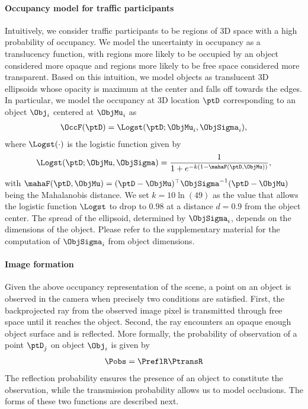 \paragraph{Occupancy model for traffic participants}
Intuitively, we consider traffic participants to be regions of 3D space with a high probability of occupancy. We model the uncertainty in occupancy as a translucency function, with regions more likely to be occupied by an object considered more opaque and regions more likely to be free space considered more transparent. Based on this intuition, we model objects as translucent 3D ellipsoids whose opacity is maximum at the center and falls off towards the edges. In particular, we model the occupancy at 3D location $\ptD$ corresponding to an object $\Obj_i$ centered at $\ObjMu_i$ as
\begin{align}
  \OccF(\ptD) = \Logst(\ptD; \ObjMu_i, \ObjSigma_i),
\end{align}
where $\Logst(\cdot)$ is the logistic function given by
\begin{align}
  \Logst(\ptD; \ObjMu, \ObjSigma) = \frac{1}{1 + e^{-k(1 - \mahaF(\ptD,\ObjMu))}},
\end{align}
with $\mahaF(\ptD, \ObjMu) = (\ptD-\ObjMu)^\top\ObjSigma^{-1}(\ptD-\ObjMu)$ being the Mahalanobis distance. We set $k = 10\ln({49})$ as the value that allows the logistic function $\Logst$ to drop to $0.98$ at a distance $d = 0.9$ from the object center. The spread of the ellipsoid, determined by $\ObjSigma_i$, depends on the dimensions of the object. Please refer to the supplementary material for the computation of $\ObjSigma_i$ from object dimensions.

\vspace{-0.3cm}
\paragraph{Image formation}
Given the above occupancy representation of the scene, a point on an object is observed in the camera when precisely two conditions are satisfied. First, the backprojected ray from the observed image pixel is transmitted through free space until it reaches the object. Second, the ray encounters an opaque enough object surface and is reflected. More formally, the probability of observation of a point $\ptD_j$ on object $\Obj_i$ is given by
\begin{align}
\Pobs = \PreflR \PtransR
\label{eq:imgform}
\end{align}
The reflection probability ensures the presence of an object to constitute the observation, while the transmission probability allows us to model occlusions. The forms of these two functions are described next.



